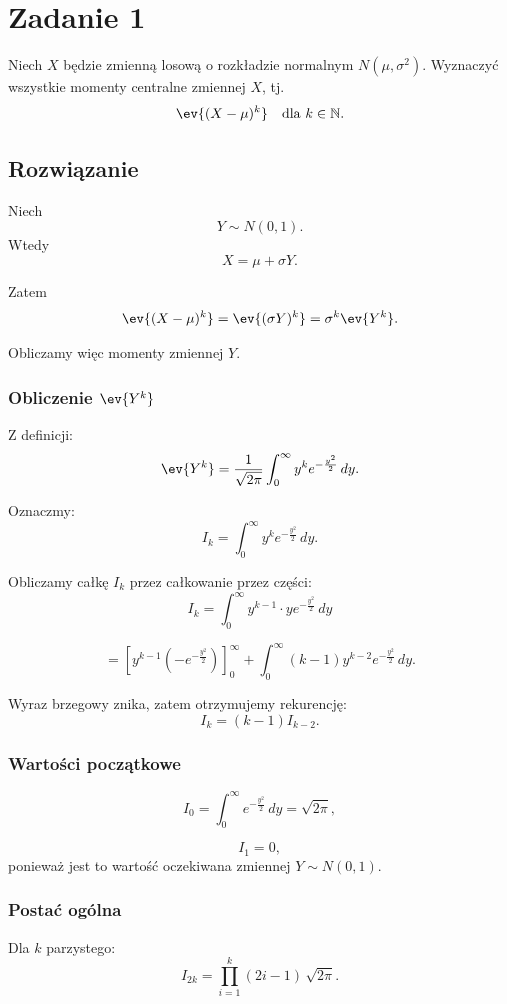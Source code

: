 \section{Zadanie 1}
Niech \(X\) będzie zmienną losową o rozkładzie normalnym \(N(\mu,\sigma^2)\).
Wyznaczyć wszystkie momenty centralne zmiennej \(X\), tj.
\[
	\ev{(X-\mu)^k} \quad \text{dla } k \in \mathbb{N}.
\]

\subsection*{Rozwiązanie}
Niech
\[
	Y \sim N(0,1).
\]
Wtedy
\[
	X = \mu + \sigma Y.
\]

Zatem
\[
	\ev{(X-\mu)^k} = \ev{(\sigma Y)^k} = \sigma^k \ev{Y^k}.
\]

Obliczamy więc momenty zmiennej \(Y\).

\subsubsection*{Obliczenie \(\ev{Y^k}\)}

Z definicji:
\[
	\ev{Y^k}
	= \frac{1}{\sqrt{2\pi}}
	\int_{0}^{\infty} y^k e^{-\frac{y^2}{2}} \, dy.
\]

Oznaczmy:
\[
	I_k = \int_{0}^{\infty} y^k e^{-\frac{y^2}{2}} \, dy.
\]

Obliczamy całkę \(I_k\) przez całkowanie przez części:
\[
	I_k
	= \int_{0}^{\infty} y^{k-1} \cdot y e^{-\frac{y^2}{2}} \, dy
\]

\[
	= \left[ y^{k-1} \left( -e^{-\frac{y^2}{2}} \right) \right]_{0}^{\infty}
	+ \int_{0}^{\infty} (k-1) y^{k-2} e^{-\frac{y^2}{2}} \, dy.
\]

Wyraz brzegowy znika, zatem otrzymujemy rekurencję:
\[
	I_k = (k-1) I_{k-2}.
\]

\subsubsection*{Wartości początkowe}

\[
	I_0 = \int_{0}^{\infty} e^{-\frac{y^2}{2}} \, dy = \sqrt{2\pi},
\]

\[
	I_1 = 0,
\]
ponieważ jest to wartość oczekiwana zmiennej \(Y \sim N(0,1)\).

\subsubsection*{Postać ogólna}

Dla \(k\) parzystego:
\[
	I_{2k} = \prod_{i=1}^{k} (2i-1)\,\sqrt{2\pi}.
\]

